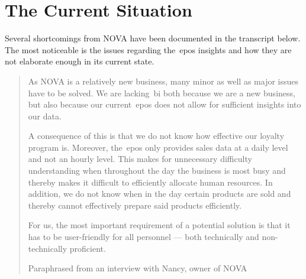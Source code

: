 \section{The Current Situation}\label{sec:the-current-situation}

Several shortcomings from NOVA have been documented in the transcript below.
The most noticeable is the issues regarding the~\acrfull{epos} insights and how they are not elaborate enough in its
current state.

\blockquote[Paraphrased from an interview with Nancy, owner of NOVA]{As NOVA is a relatively new business, many minor as
well as major issues have to be solved.
We are lacking~\acrshort{bi} both because we are a new business, but also because our current~\acrshort{epos} does not
allow for sufficient insights into our data.

A consequence of this is that we do not know how effective our loyalty program is.
Moreover, the~\acrshort{epos} only provides sales data at a daily level and not an hourly level.
This makes for unnecessary difficulty understanding when throughout the day the business is most busy and thereby makes
it difficult to efficiently allocate human resources.
In addition, we do not know when in the day certain products are sold and thereby cannot effectively prepare said
products efficiently.

For us, the most important requirement of a potential solution is that it has to be user-friendly for all personnel ---
both technically and non-technically proficient.}
